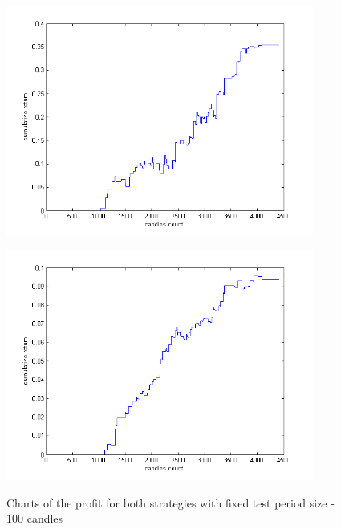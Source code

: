 \documentclass{tewiart}
\begin{document}
\begin{figure}[h!]
\begin{minipage}{.49\linewidth}
\begin{center}
\includegraphics[width=0.9\textwidth]{pictures/mic_100.png}
\label{MiC100}
\end{center}
\end{minipage}
\begin{minipage}{.49\linewidth}
\begin{center}
\includegraphics[width=0.9\textwidth]{pictures/mid_100.png}
\label{MiD100}
\end{center}
\end{minipage}

\caption{Charts of the profit for both strategies with fixed test period size - 100 candles}
\end{figure}
\FloatBarrier
\end{document}

